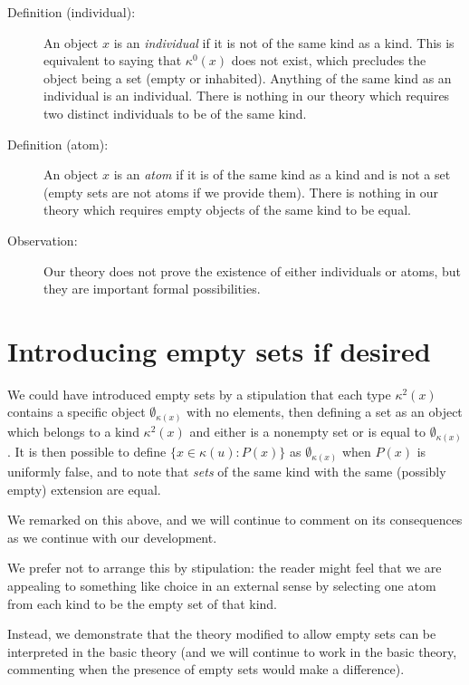 \documentclass[12pt]{article}
\begin{document}
\begin{description}

\item[Definition (individual):]  An object $x$ is an {\em individual\/} if it is not of the same kind as a kind.  This is equivalent to saying that $\kappa^0(x)$ does not exist, which precludes
the object being a set (empty or inhabited).  Anything of the same kind as an individual is an individual.  There is nothing in our theory which requires two distinct individuals to be of the same kind.

\item[Definition (atom):]  An object $x$ is an {\em atom\/} if it is of the same kind as a kind and is not a set (empty sets are not atoms if we provide them).  There is nothing in our theory which requires empty objects of the same kind to be equal.

\item[Observation:]  Our theory does not prove the existence of either individuals or atoms, but they are important formal possibilities.

\end{description}

\newpage

\section{Introducing empty sets if desired}

We could have introduced empty sets by a stipulation that each type $\kappa^2(x)$ contains a specific object $\emptyset_{\kappa(x)}$ with no elements, then defining a set as an object which belongs to a kind $\kappa^2(x)$ and either is a nonempty set or is equal to $\emptyset_{\kappa(x)}$.  It is then possible to define $\{x \in \kappa(u):P(x)\}$ as $\emptyset_{\kappa(x)}$ when $P(x)$ is uniformly false, and to note that {\em sets\/} of the same kind with the same (possibly empty) extension are equal. 

We remarked on this above, and we will continue to comment on its consequences as we continue with our development.

We prefer not to arrange this by stipulation:  the reader might feel that we are appealing to something like choice in an external sense by selecting one atom from each kind to be the empty set of that kind.

Instead, we demonstrate that the theory modified to allow empty sets can be interpreted in the basic theory (and we will continue to work in the basic theory, commenting when the presence of empty sets would make a difference).
\end{document}
